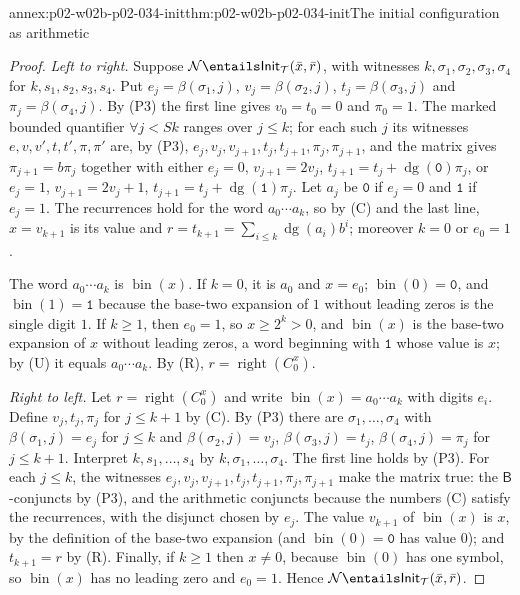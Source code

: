 \begin{annexitem}{annex:p02-w02b-p02-034-init}{thm:p02-w02b-p02-034-init}{The initial configuration as arithmetic}
\begin{proof}
\emph{Left to right.}  Suppose
\(\mathcal N\entails\mathsf{Init}_{\mathcal T}(\bar x,\bar r)\), with witnesses
\(k,\sigma_1,\sigma_2,\sigma_3,\sigma_4\) for \(k,s_1,s_2,s_3,s_4\).  Put
\(e_j=\beta(\sigma_1,j)\), \(v_j=\beta(\sigma_2,j)\), \(t_j=\beta(\sigma_3,j)\)
and \(\pi_j=\beta(\sigma_4,j)\).  By (P3) the first line gives
\(v_0=t_0=0\) and \(\pi_0=1\).  The marked bounded quantifier
\(\forall j<Sk\) ranges over \(j\le k\); for each such \(j\) its witnesses
\(e,v,v',t,t',\pi,\pi'\) are, by (P3), \(e_j,v_j,v_{j+1},t_j,t_{j+1},\pi_j,\pi_{j+1}\),
and the matrix gives \(\pi_{j+1}=b\pi_j\) together with either
\(e_j=0\), \(v_{j+1}=2v_j\), \(t_{j+1}=t_j+\operatorname{dg}(\mathtt 0)\pi_j\),
or \(e_j=1\), \(v_{j+1}=2v_j+1\), \(t_{j+1}=t_j+\operatorname{dg}(\mathtt 1)\pi_j\).
Let \(a_j\) be \(\mathtt 0\) if \(e_j=0\) and \(\mathtt 1\) if \(e_j=1\).  The
recurrences hold for the word \(a_0\cdots a_k\), so by (C) and the last line,
\(x=v_{k+1}\) is its value and \(r=t_{k+1}=\sum_{i\le k}\operatorname{dg}(a_i)b^i\);
moreover \(k=0\) or \(e_0=1\).

The word \(a_0\cdots a_k\) is \(\operatorname{bin}(x)\).  If \(k=0\), it is
\(a_0\) and \(x=e_0\); \(\operatorname{bin}(0)=\mathtt 0\), and
\(\operatorname{bin}(1)=\mathtt 1\) because the base-two expansion of \(1\)
without leading zeros is the single digit \(1\).  If \(k\ge1\), then
\(e_0=1\), so \(x\ge2^k>0\), and \(\operatorname{bin}(x)\) is the base-two
expansion of \(x\) without leading zeros, a word beginning with
\(\mathtt 1\) whose value is \(x\); by (U) it equals \(a_0\cdots a_k\).  By (R),
\(r=\operatorname{right}(C^x_0)\).

\emph{Right to left.}  Let \(r=\operatorname{right}(C^x_0)\) and write
\(\operatorname{bin}(x)=a_0\cdots a_k\) with digits \(e_i\).  Define
\(v_j,t_j,\pi_j\) for \(j\le k+1\) by (C).  By (P3) there are
\(\sigma_1,\ldots,\sigma_4\) with \(\beta(\sigma_1,j)=e_j\) for \(j\le k\) and
\(\beta(\sigma_2,j)=v_j\), \(\beta(\sigma_3,j)=t_j\), \(\beta(\sigma_4,j)=\pi_j\)
for \(j\le k+1\).  Interpret \(k,s_1,\ldots,s_4\) by
\(k,\sigma_1,\ldots,\sigma_4\).  The first line holds by (P3).  For each
\(j\le k\), the witnesses \(e_j,v_j,v_{j+1},t_j,t_{j+1},\pi_j,\pi_{j+1}\)
make the matrix true: the \(\mathsf B\)-conjuncts by (P3), and the arithmetic
conjuncts because the numbers (C) satisfy the recurrences, with the disjunct
chosen by \(e_j\).  The value \(v_{k+1}\) of \(\operatorname{bin}(x)\) is
\(x\), by the definition of the base-two expansion (and
\(\operatorname{bin}(0)=\mathtt 0\) has value \(0\)); and
\(t_{k+1}=r\) by (R).  Finally, if \(k\ge1\) then \(x\ne0\), because
\(\operatorname{bin}(0)\) has one symbol, so \(\operatorname{bin}(x)\) has no
leading zero and \(e_0=1\).  Hence
\(\mathcal N\entails\mathsf{Init}_{\mathcal T}(\bar x,\bar r)\).
\end{proof}
\end{annexitem}

